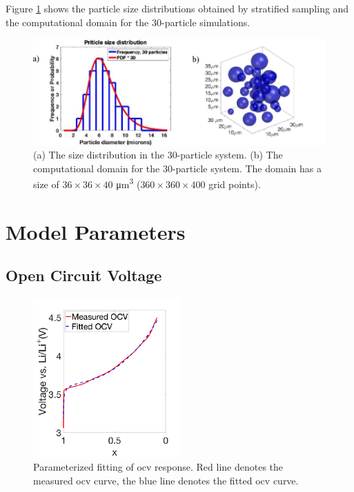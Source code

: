 \documentclass{article}
\begin{document}
Figure \ref{fig:30-particle-box} shows the particle size distributions
obtained by stratified sampling\cite{parsons2017} and the
computational domain for the 30-particle simulations.

\begin{figure}
  \includegraphics[width=\textwidth]{30-particle-simulation.pdf}
  \caption{(a) The size distribution in the 30-particle system. (b) The
    computational domain for the 30-particle system. The domain has a
    size of $36 \times 36 \times 40$ \si{\micro\meter\cubed} ($360
    \times 360 \times 400$ grid points).}
  \label{fig:30-particle-box}
\end{figure}

\section{Model Parameters}

\subsection{Open Circuit Voltage}

\begin{figure}
  \begin{center}
    \includegraphics[width=0.5\textwidth]{echem-fit.pdf}
  \end{center}
  \caption{Parameterized fitting of \gls{ocv} response. Red line
    denotes the measured \gls{ocv} curve, the blue line denotes the
    fitted \gls{ocv} curve.}
  \label{fig:ocv-response}
\end{figure}
\end{document}
